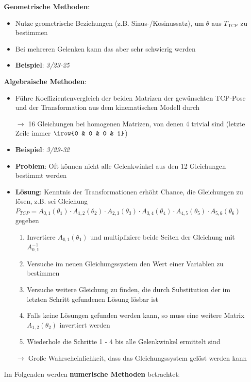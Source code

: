 \bigskip
\textbf{Geometrische Methoden}:
\begin{itemize}
	\item Nutze geometrische Beziehungen (z.B. Sinus-/Kosinussatz), um $\theta$ aus $T_\text{TCP}$ zu bestimmen
	\item Bei mehreren Gelenken kann das aber sehr schwierig werden
	\item \textbf{Beispiel}: \textit{3/23-25}
\end{itemize}
\bigskip
\textbf{Algebraische Methoden}:
\begin{itemize}
	\item Führe Koeffizientenvergleich der beiden Matrizen der gewünschten TCP-Pose und der Transformation aus dem kinematischen Modell durch
	
	$\rightarrow$ 16 Gleichungen bei homogenen Matrizen, von denen 4 trivial sind (letzte Zeile immer $\irow{0 & 0 & 0 & 1}$)
	
	\item \textbf{Beispiel}: \textit{3/29-32} 
	\item \textbf{Problem}: Oft können nicht alle Gelenkwinkel aus den 12 Gleichungen bestimmt werden
	\item \textbf{Lösung}: Kenntnis der Transformationen erhöht Chance, die Gleichungen zu lösen, z.B. sei Gleichung $P_{TCP}=A_{0,1}(\theta_1)\cdot A_{1,2}(\theta_2)\cdot A_{2,3}(\theta_3)\cdot A_{3,4}(\theta_4)\cdot A_{4,5}(\theta_5)\cdot A_{5,6}(\theta_6)$ gegeben
	\begin{enumerate}
		\item Invertiere $A_{0,1}(\theta_1)$ und multipliziere beide Seiten der Gleichung mit $A_{0,1}^{-1}$
		\item Versuche im neuen Gleichungssystem den Wert einer Variablen zu bestimmen
		\item Versuche weitere Gleichung zu finden, die durch Substitution der im
		letzten Schritt gefundenen Lösung lösbar ist
		\item Falls keine Lösungen gefunden werden kann, so muss eine weitere Matrix $A_{1,2}(\theta_2)$ invertiert werden
		\item Wiederhole die Schritte 1 - 4 bis alle Gelenkwinkel ermittelt sind
	\end{enumerate}
	
	$\rightarrow$ Große Wahrscheinlichkeit, dass das Gleichungssystem gelöst werden kann
\end{itemize}
\bigskip
Im Folgenden werden \textbf{numerische Methoden} betrachtet:

